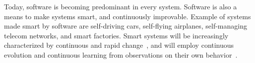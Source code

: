 \documentclass[12pt]{article}
\begin{document}
Today, software is becoming predominant in every  system. Software is also a means to make systems smart, and continuously improvable.
Example of systems made smart by software are 
self-driving cars, self-flying
airplanes, self-managing telecom networks, and smart
factories. 
Smart systems will be increasingly characterized by continuous and rapid change~\cite{Mens2008}, and
will employ continuous evolution %
and continuous learning 
from observations on their own
behavior~\cite{Bosch2016}. 
\end{document}
